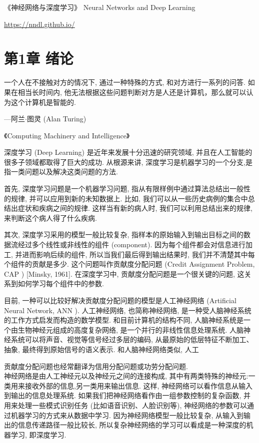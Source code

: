 \documentclass[10pt]{article}
\begin{document}
《神经网络与深度学习》 Neural Networks and Deep Learning

\href{https://nndl.github.io/}{https://nndl.github.io/}





\section*{第1章 绪论}
一个人在不接触对方的情况下, 通过一种特殊的方式, 和对方进行一系列的问答. 如果在相当长时间内, 他无法根据这些问题判断对方是人还是计算机，那么就可以认为这个计算机是智能的.

—阿兰$\cdot$图灵 (Alan Turing)

《Computing Machinery and Intelligence》

深度学习 (Deep Learning) 是近年来发展十分迅速的研究领域, 并且在人工智能的很多子领域都取得了巨大的成功. 从根源来讲, 深度学习是机器学习的一个分支,是指一类问题以及解决这类问题的方法.

首先, 深度学习问题是一个机器学习问题, 指从有限样例中通过算法总结出一般性的规律, 并可以应用到新的未知数据上. 比如, 我们可以从一些历史病例的集合中总结出症状和疾病之间的规律. 这样当有新的病人时, 我们可以利用总结出来的规律,来判断这个病人得了什么疾病.

其次, 深度学习采用的模型一般比较复杂, 指样本的原始输入到输出目标之间的数据流经过多个线性或非线性的组件 (component). 因为每个组件都会对信息进行加工, 并进而影响后续的组件, 所以当我们最后得到输出结果时, 我们并不清楚其中每个组件的贡献是多少. 这个问题叫作贡献度分配问题 (Credit Assignment Problem, CAP ) [Minsky, 1961]. 在深度学习中, 贡献度分配问题是一个很关键的问题, 这关系到如何学习每个组件中的参数.

目前, 一种可以比较好解决贡献度分配问题的模型是人工神经网络 (Artificial Neural Network, ANN ). 人工神经网络, 也简称神经网络, 是一种受人脑神经系统的工作方式启发而构造的数学模型. 和目前计算机的结构不同, 人脑神经系统是一个由生物神经元组成的高度复杂网络, 是一个并行的非线性信息处理系统. 人脑神经系统可以将声音、视觉等信号经过多层的编码, 从最原始的低层特征不断加工、抽象, 最终得到原始信号的语义表示. 和人脑神经网络类似, 人工

贡献度分配问题也经常翻译为信用分配问题或功劳分配问题.\\
神经网络是由人工神经元以及神经元之间的连接构成, 其中有两类特殊的神经元:一类用来接收外部的信息,另一类用来输出信息. 这样, 神经网络可以看作信息从输入到输出的信息处理系统. 如果我们把神经网络看作由一组参数控制的复杂函数, 并用来处理一些模式识别任务 (比如语音识别、人脸识别等), 神经网络的参数可以通过机器学习的方式来从数据中学习. 因为神经网络模型一般比较复杂, 从输入到输出的信息传递路径一般比较长, 所以复杂神经网络的学习可以看成是一种深度的机器学习, 即深度学习.
\end{document}
